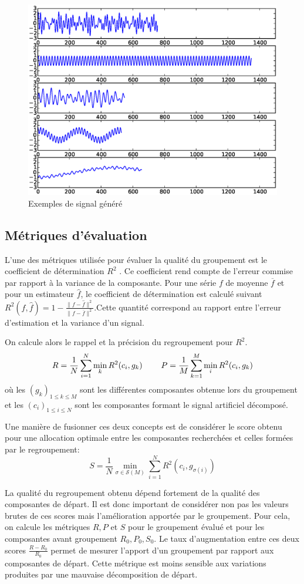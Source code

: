 \documentclass{gretsi}
\begin{document}
    \begin{figure}[htp]
\centering
\includegraphics[width=.5\textwidth]{img/artsig.eps}
\vspace{-.7cm}\caption{Exemples de signal généré}
\label{}
\end{figure}


\subsection{Métriques d'évaluation}
\label{sub:met}

L'une des métriques utilisée pour évaluer la qualité du groupement est le coefficient de détermination $R^2$ \cite{abalov_14_auto}. Ce coefficient rend compte de l'erreur commise par rapport à la variance de la composante. Pour une série $f$ de moyenne $\overline f$ et pour un estimateur $\widehat f$, le coefficient de détermination est calculé suivant $R^2(f, \widehat f) = 1 - \frac{\|f-\widehat f\|^2}{\|f-\overline f\|^2}$.Cette quantité correspond au rapport entre l'erreur d'estimation et la variance d'un signal. 

On calcule alors le rappel et la précision du regroupement pour $R^2$.
    $$
        R = \frac{1}{N} \sum_{i=1}^N \min_k R^2(c_i, g_k) \hspace{0.8cm} P = \frac{1}{M}\sum_{k=1}^M \min_i R^2(c_i, g_k)
    $$où les $(g_k)_{1\le k \le M}$ sont les différentes composantes obtenue lors du groupement et les $(c_i)_{1\le i\le N}$ sont les composantes formant le signal artificiel décomposé.
    
    Une manière de fusionner ces deux concepts est de considérer le score obtenu pour une allocation optimale entre les composantes recherchées et celles formées par le regroupement:$$
        S =  \frac{1}{N} \min_{\sigma \in \mathcal S(M)} \sum_{i=1}^N R^2(c_i, g_{\sigma(i)})
    $$
    
    La qualité du regroupement obtenu dépend fortement de la qualité des composantes de départ. Il est donc important de considérer non pas les valeurs brutes de ces scores mais l'amélioration apportée par le groupement. Pour cela, on calcule les métriques $R, P$ et $S$ pour le groupement évalué et pour les composantes avant groupement $R_0, P_0, S_0$. Le taux d'augmentation entre ces deux scores $\frac{R-R_0}{R_0}$ permet de mesurer l'apport d'un groupement par rapport aux composantes de départ. Cette métrique est moins sensible aux variations produites par une mauvaise décomposition de départ.
    
\end{document}
